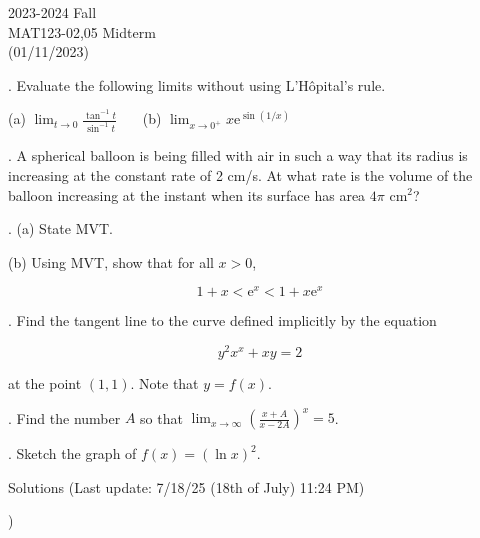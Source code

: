 \documentclass{article}
\begin{document}
\large

\begin{center}
2023-2024 Fall \\MAT123-02,05 Midterm\\(01/11/2023)
\end{center}

. Evaluate the following limits without using L'Hôpital's rule.

\hfill

(a) $\displaystyle \lim_{t\to 0} \frac{\tan^{-1} t}{\sin^{-1} t}$ \ \ \ (b) $\displaystyle \lim_{x\to 0^+} x\mathrm{e}^{\displaystyle \sin(1/x)}$

\hfill

. A spherical balloon is being filled with air in such a way that its radius is increasing at the constant rate of 2 cm/s. At what rate is the volume of the balloon increasing at the instant when its surface has area $4\pi$ cm$^2$?

\hfill

. (a) State MVT.

\hfill

\noindent (b) Using MVT, show that for all $x>0$,

\begin{equation*}
1+x < \mathrm{e}^x < 1+x\mathrm{e}^x
\end{equation*}

\hfill

. Find the tangent line to the curve defined implicitly by the equation

\begin{equation*}
y^2x^x + xy = 2
\end{equation*}

\noindent at the point $(1,1)$. Note that $y=f(x)$.

\hfill

. Find the number $A$ so that $\displaystyle \lim_{x \to \infty} \left(\frac{x+A}{x-2A}\right)^{x}= 5$.

\hfill

. Sketch the graph of $\displaystyle f(x) = (\ln x)^2$.

\newpage

\begin{center}
Solutions (Last update: 7/18/25 (18th of July) 11:24 PM)
\end{center}

)

\hfill
\end{document}
